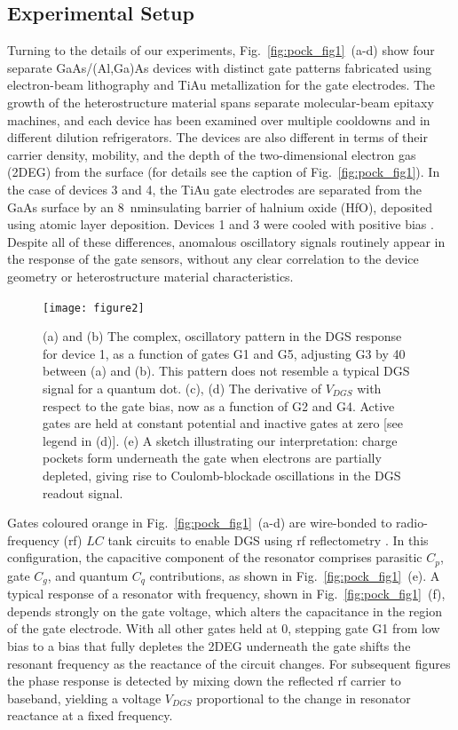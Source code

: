 \subsection{Experimental Setup}
Turning to the details of our experiments, Fig.~\ref{fig:pock_fig1}~(a-d) show four separate GaAs/(Al,Ga)As devices with distinct gate patterns fabricated using electron-beam lithography and TiAu metallization for the gate electrodes. The growth of the heterostructure material spans separate molecular-beam epitaxy machines, and each device has been examined over multiple cooldowns and in different dilution refrigerators. The devices are also different in terms of their carrier density, mobility, and the depth of the two-dimensional electron gas (2DEG) from the surface (for details see the caption of Fig.~\ref{fig:pock_fig1}).  In the case of devices 3 and 4, the TiAu gate electrodes are separated from the GaAs surface by an \SI{8}{\nano\meter}insulating barrier of halnium oxide (HfO), deposited using atomic layer deposition. Devices 1 and 3 were cooled with positive bias \cite{PhysRevB.72.115331}. Despite all of these differences, anomalous oscillatory signals routinely appear in the response of the gate sensors, without any clear correlation to the device geometry or heterostructure material characteristics.

\begin{figure}
\texttt{[image: figure2]}
\caption[Signals of charge pockets under gates in quantum dot structures]{\label{fig:pock_fig2} (a) and (b) The complex, oscillatory pattern in the DGS response for device 1, as a function of gates G1 and G5, adjusting G3 by \SI{40}{\mv} between (a) and (b). This pattern does not resemble a typical DGS signal for a quantum dot.  (c), (d) The derivative of $V_{DGS}$ with respect to the gate bias, now as a function of G2 and G4. Active gates are held at constant potential and inactive gates at zero [see legend in (d)]. (e) A sketch illustrating our interpretation: charge pockets form underneath the gate when electrons are partially depleted, giving rise to Coulomb-blockade oscillations in the DGS readout signal.}
\end{figure}

Gates coloured orange in Fig.~\ref{fig:pock_fig1}~(a-d) are wire-bonded to radio-frequency (rf) $LC$ tank circuits to enable DGS using rf reflectometry \cite{PhysRevLett.110.046805,doi:10.1063/1.4868107}. In this configuration, the capacitive component of the resonator comprises parasitic $C_p$, gate $C_g$, and quantum $C_q$ contributions, as shown in Fig.~\ref{fig:pock_fig1}~(e). A typical response of a resonator with frequency, shown in Fig.~\ref{fig:pock_fig1}~(f), depends strongly on the gate voltage, which alters the capacitance in the region of the gate electrode. With all other gates held at \SI{0}{\mv}, stepping gate G1 from low bias to a bias that fully depletes the 2DEG underneath the gate  shifts the resonant frequency as the reactance of the circuit changes. For subsequent figures the phase response is detected by mixing down the reflected rf carrier to baseband, yielding a voltage $V_{DGS}$ proportional to the change in resonator reactance at a fixed frequency.

